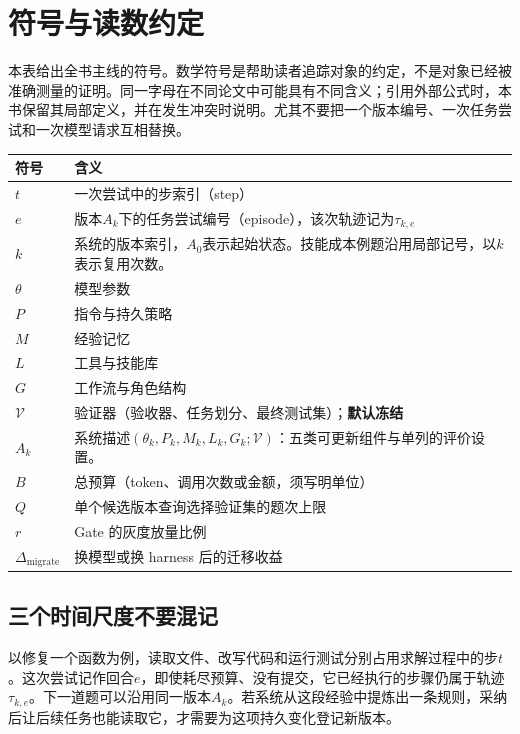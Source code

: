 \chapter{符号与读数约定}

本表给出全书主线的符号。数学符号是帮助读者追踪对象的约定，不是对象已经被准确测量的证明。同一字母在不同论文中可能具有不同含义；引用外部公式时，本书保留其局部定义，并在发生冲突时说明。尤其不要把一个版本编号、一次任务尝试和一次模型请求互相替换。

\begin{longtable}{@{}p{2.4cm}p{10.5cm}@{}}
\toprule
符号 & 含义 \\
\midrule
\endhead
$t$ & 一次尝试中的步索引（step） \\
$e$ & 版本$A_k$下的任务尝试编号（episode），该次轨迹记为$\tau_{k,e}$ \\
$k$ & 系统的版本索引，$A_0$表示起始状态。技能成本例题沿用局部记号，以$k$表示复用次数。 \\
$\theta$ & 模型参数 \\
$P$ & 指令与持久策略 \\
$M$ & 经验记忆 \\
$L$ & 工具与技能库 \\
$G$ & 工作流与角色结构 \\
$\mathcal{V}$ & 验证器（验收器、任务划分、最终测试集）；\textbf{默认冻结} \\
$A_k$ & 系统描述$(\theta_k,P_k,M_k,L_k,G_k;\mathcal V)$：五类可更新组件与单列的评价设置。 \\
$B$ & 总预算（token、调用次数或金额，须写明单位） \\
$Q$ & 单个候选版本查询选择验证集的题次上限 \\
$r$ & Gate 的灰度放量比例 \\
$\Delta_{\text{migrate}}$ & 换模型或换 harness 后的迁移收益 \\
\bottomrule
\end{longtable}

\section*{三个时间尺度不要混记}

以修复一个函数为例，读取文件、改写代码和运行测试分别占用求解过程中的步$t$。这次尝试记作回合$e$，即使耗尽预算、没有提交，它已经执行的步骤仍属于轨迹$\tau_{k,e}$。下一道题可以沿用同一版本$A_k$。若系统从这段经验中提炼出一条规则，采纳后让后续任务也能读取它，才需要为这项持久变化登记新版本。

